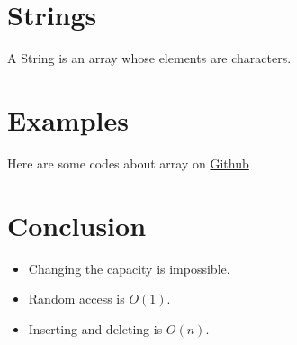 \section{Strings}

A String is an array whose elements are characters.


\section{Examples}

Here are some codes about array on \href{https://github.com/mingmingli916/algorithms/tree/main/array}{Github}


\section{Conclusion}
\label{sec:conclusion}

\begin{itemize}
\item Changing the capacity is impossible.
\item Random access is $O(1)$.
\item Inserting and deleting is $O(n)$.
\end{itemize}


